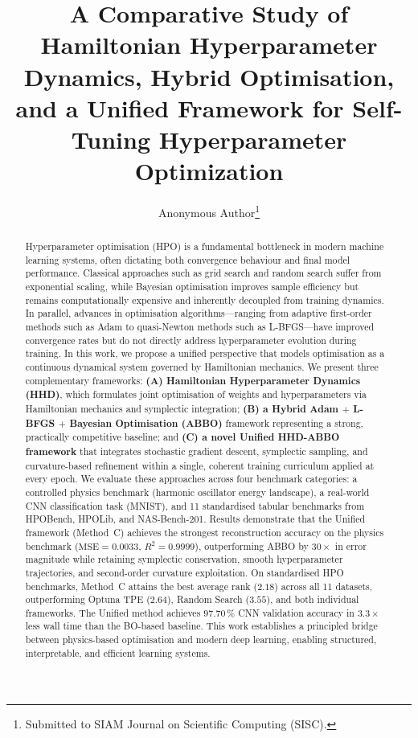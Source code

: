 \documentclass[12pt,a4paper]{article}
\title{A Comparative Study of Hamiltonian Hyperparameter Dynamics,
       Hybrid Optimisation, and a Unified Framework for
       Self-Tuning Hyperparameter Optimization}
\author{Anonymous Author\thanks{Submitted to SIAM Journal on Scientific Computing (SISC).}}
\begin{document}
\maketitle


\begin{abstract}
Hyperparameter optimisation (HPO) is a fundamental bottleneck in
modern machine learning systems, often dictating both convergence
behaviour and final model performance.  Classical approaches such as
grid search and random search suffer from exponential scaling, while
Bayesian optimisation improves sample efficiency but remains
computationally expensive and inherently decoupled from training
dynamics.  In parallel, advances in optimisation algorithms—ranging
from adaptive first-order methods such as Adam to quasi-Newton methods
such as L-BFGS—have improved convergence rates but do not directly
address hyperparameter evolution during training.
In this work, we propose a unified perspective that models optimisation
as a continuous dynamical system governed by Hamiltonian mechanics.  We
present three complementary frameworks: \textbf{(A) Hamiltonian
Hyperparameter Dynamics (HHD)}, which formulates joint optimisation of
weights and hyperparameters via Hamiltonian mechanics and symplectic
integration; \textbf{(B) a Hybrid Adam $+$ L-BFGS $+$ Bayesian
Optimisation (ABBO)} framework representing a strong, practically
competitive baseline; and \textbf{(C) a novel Unified HHD-ABBO
framework} that integrates stochastic gradient descent, symplectic
sampling, and curvature-based refinement within a single, coherent
training curriculum applied at every epoch.
We evaluate these approaches across four benchmark categories: a
controlled physics benchmark (harmonic oscillator energy landscape),
a real-world CNN classification task (MNIST), and 11 standardised
tabular benchmarks from HPOBench, HPOLib, and NAS-Bench-201.  Results
demonstrate that the Unified framework (Method~C) achieves the
strongest reconstruction accuracy on the physics benchmark
($\mathrm{MSE} = 0.0033$, $R^2 = 0.9999$), outperforming ABBO by
$30\times$ in error magnitude while retaining symplectic conservation,
smooth hyperparameter trajectories, and second-order curvature
exploitation.  On standardised HPO benchmarks, Method~C attains the
best average rank ($2.18$) across all 11 datasets, outperforming
Optuna TPE ($2.64$), Random Search ($3.55$), and both individual
frameworks.  The Unified method achieves $97.70\,\%$ CNN validation
accuracy in $3.3\times$ less wall time than the BO-based baseline.
This work establishes a principled bridge between physics-based
optimisation and modern deep learning, enabling structured,
interpretable, and efficient learning systems.
\end{abstract}
\end{document}
